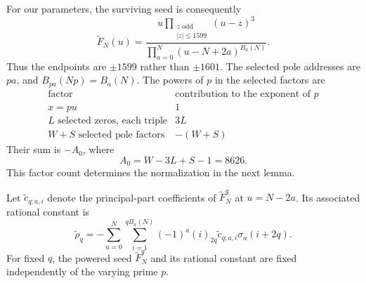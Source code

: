 \documentclass[11pt]{article}
\begin{document}
For our parameters, the surviving seed is consequently
\begin{equation}\label{eq:trim}
 \widetilde F_N(u)=
 \frac{u\prod_{\substack{z\text{ odd}\\|z|\le1599}}(u-z)^3}
 {\prod_{a=0}^N(u-N+2a)^{B_a(N)}}.
\end{equation}
Thus the endpoints are $\pm1599$ rather than $\pm1601$.
The selected pole addresses are $pa$, and
$B_{pa}(Np)=B_a(N)$. The powers of $p$ in the selected factors are
\[
 \begin{array}{c|c}
 \text{factor}&\text{contribution to the exponent of }p\\\hline
 x=pu & 1\\
 L\text{ selected zeros, each triple} & 3L\\
 W+S\text{ selected pole factors} & -(W+S)
 \end{array}
\]
Their sum is $-A_0$, where
\begin{equation}\label{eq:A0}
 A_0=W-3L+S-1=8626.
\end{equation}
This factor count determines the normalization in the next lemma.

Let $\widetilde c_{q;a,i}$ denote the principal-part coefficients of
$\widetilde F_N^q$ at $u=N-2a$. Its associated rational constant is
\begin{equation}\label{eq:seedrho}
 \widetilde\rho_q=-\sum_{a=0}^N\sum_{i=1}^{qB_a(N)}
                  (-1)^a(i)_{2q}\widetilde c_{q;a,i}\sigma_a(i+2q).
\end{equation}
For fixed $q$, the powered seed $\widetilde F_N^q$ and its rational
constant are fixed independently of the varying prime $p$.
\end{document}
